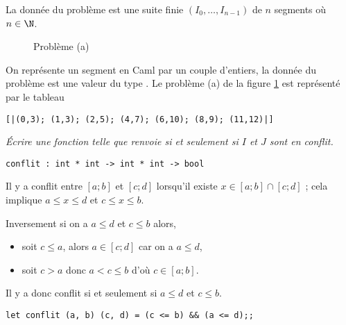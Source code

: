 La donnée du problème est une suite finie $(I_0,\dots,I_{n-1})$ de $n$ segments où $n\in \N$.

\begin{figure}[ht]
\centering
{}
\caption{\label{fig:pba}Problème (a)}
\end{figure} 
On représente un segment en Caml par un couple d'entiers, la donnée du
problème est une valeur du type . Le problème (a) de
la figure \ref{fig:pba} est représenté par le tableau
\begin{lstlisting}
[|(0,3); (1,3); (2,5); (4,7); (6,10); (8,9); (11,12)|]
\end{lstlisting}
\begin{Exercise}\it
Écrire une fonction  telle que 
renvoie  si et seulement si $I$ et $J$ sont en conflit.
\end{Exercise}  
\begin{lstlisting}
conflit : int * int -> int * int -> bool
\end{lstlisting}
\begin{Answer}
Il y a conflit entre $[a;b]$ et $[c;d]$ lorsqu'il existe $x\in [a;b] \cap [c;d]$ ; cela implique $a \le x \le d$ et $c \le x \le b$.

Inversement si on a $a \le d$ et $c \le b$ alors,
\begin{itemize}
    \item soit $c\le a$, alors $a\in [c;d]$ car on a $a\le d$,
    \item soit $c > a$ donc $a < c \le b$ d'où $c\in [a;b]$.
\end{itemize}
Il y a donc conflit si et seulement si $a \le d$ et $c \le b$.

\begin{lstlisting}
let conflit (a, b) (c, d) = (c <= b) && (a <= d);;
\end{lstlisting} 
\end{Answer}

